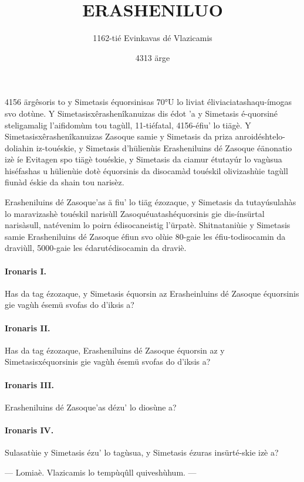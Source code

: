 \documentclass{article}
\title{\textbf{ERASHENILUO}}
\author{1162-tié Evinkavas dé Vlazicamis}
\date{4313 ärge}
\begin{document}
    
\maketitle

4156 ärgêsoris to y Simetasis équorsinisas 70°U lo liviat éliviaciatashaqu-ímogas svo dotùne.
Y Simetasisxêrashenîkanuizas dis édot 'a y Simetasis é-quorsiné steligamalig l'aifidomùm tou tagùll, 11-tiéfatal, 4156-éfiu' lo tiägè.
Y Simetasisxêrashenîkanuizas Zasoque samie y Simetasis da priza anroidéshtelo-doliahin iz-touéskie, y Simetasis d'hülienùis Erasheniluins dé Zasoque éänonatio izè íe Evitagen spo tiägè touéskie, y Simetasis da ciamur étutayúr lo vagùsua hiséfashas u hülienùie dotè équorsinis da disocamàd touéskil olivizashùie tagùll fiunàd éskie da shain tou narisèz.

Erasheniluins dé Zasoque'as ä fiu' lo tiäg ézozaque, y Simetasis da tutayúsulahàs lo maravizashè touéskil narisùll Zasoquéuatashéquorsinis gie dis-ínsürtal narisàsull, natévenim lo poirn édisocaneistig l'ürpatè. Shitnataniùie y Simetasis samie Erasheniluins dé Zasoque éfiun svo olùie 80-gaie les éfiu-todisocamin da draviùll, 5000-gaie les édarutédisocamin da draviè.

\paragraph{Ironaris I.}
Has da tag ézozaque, y Simetasis équorsin az Erasheinluins dé Zasoque équorsinis gie vagùh ésemü svofas do d'iksis a?

\paragraph{Ironaris II.}
Has da tag ézozaque, Erasheniluins dé Zasoque équorsin az y Simetasisxéquorsinis gie vagùh ésemü svofas do d'iksis a?

\paragraph{Ironaris III.}
Erasheniluins dé Zasoque'as dézu' lo diosùne a?

\paragraph{Ironaris IV.}
Sulasatùie y Simetasis ézu' lo tagùsua, y Simetasis ézuras insürté-skie izè a?

\begin{center}
    — Lomiaè. Vlazicamis lo tempùqûll quiveshùhum. —
\end{center}
\end{document}
